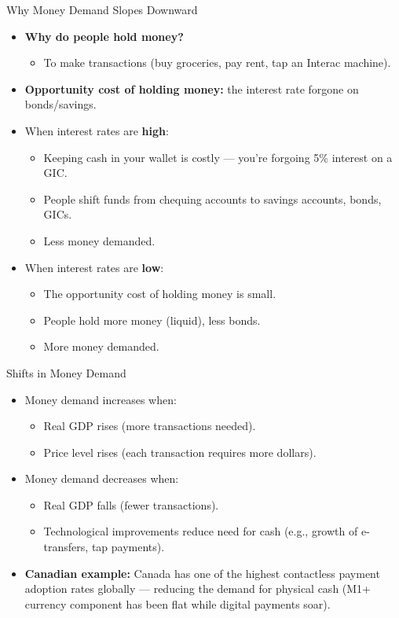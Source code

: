 \documentclass[aspectratio=169]{beamer}
\begin{document}
\begin{frame}{Why Money Demand Slopes Downward}
\transfade
\begin{itemize}[<+->]
  \item \textbf{Why do people hold money?}
  \begin{itemize}[<+->]
    \item To make transactions (buy groceries, pay rent, tap an Interac machine).
  \end{itemize}
  \item \textbf{Opportunity cost of holding money:} the interest rate forgone on bonds/savings.
  \item When interest rates are \textbf{high}:
  \begin{itemize}[<+->]
    \item Keeping cash in your wallet is costly --- you're forgoing 5\% interest on a GIC.
    \item People shift funds from chequing accounts to savings accounts, bonds, GICs.
    \item \alert{Less money demanded}.
  \end{itemize}
  \item When interest rates are \textbf{low}:
  \begin{itemize}[<+->]
    \item The opportunity cost of holding money is small.
    \item People hold more money (liquid), less bonds.
    \item \alert{More money demanded}.
  \end{itemize}
\end{itemize}
\end{frame}

\begin{frame}{Shifts in Money Demand}
\transfade
\begin{itemize}[<+->]
  \item Money demand increases when:
  \begin{itemize}[<+->]
    \item Real GDP rises (more transactions needed).
    \item Price level rises (each transaction requires more dollars).
  \end{itemize}
  \item Money demand decreases when:
  \begin{itemize}[<+->]
    \item Real GDP falls (fewer transactions).
    \item Technological improvements reduce need for cash (e.g., growth of e-transfers, tap payments).
  \end{itemize}
  \item \textbf{Canadian example:} Canada has one of the highest contactless payment adoption rates globally --- reducing the demand for physical cash (M1+ currency component has been flat while digital payments soar).
\end{itemize}
\end{frame}
\end{document}
